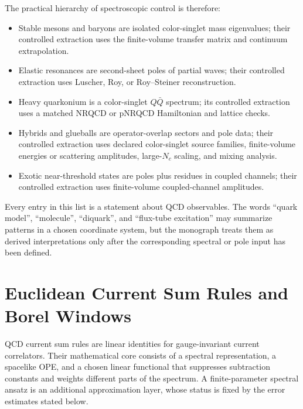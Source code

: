 The practical hierarchy of spectroscopic control is therefore:
\begin{itemize}
  \item Stable mesons and baryons are isolated color-singlet mass eigenvalues;
  their controlled extraction uses the finite-volume transfer matrix and
  continuum extrapolation.
  \item Elastic resonances are second-sheet poles of partial waves; their
  controlled extraction uses Luscher, Roy, or Roy--Steiner reconstruction.
  \item Heavy quarkonium is a color-singlet \(Q\bar Q\) spectrum; its
  controlled extraction uses a matched NRQCD or pNRQCD Hamiltonian and
  lattice checks.
  \item Hybrids and glueballs are operator-overlap sectors and pole data; their
  controlled extraction uses declared color-singlet source families,
  finite-volume energies or scattering amplitudes, large-\(N_c\) scaling, and
  mixing analysis.
  \item Exotic near-threshold states are poles plus residues in coupled
  channels; their controlled extraction uses finite-volume coupled-channel
  amplitudes.
\end{itemize}
Every entry in this list is a statement about QCD observables.  The words
``quark model'', ``molecule'', ``diquark'', and ``flux-tube excitation'' may
summarize patterns in a chosen coordinate system, but the monograph treats
them as derived interpretations only after the corresponding spectral or pole
input has been defined.

\section{Euclidean Current Sum Rules and Borel Windows}
\label{sec:qcd-current-sum-rules-borel-windows}

QCD current sum rules are linear identities for gauge-invariant current
correlators.  Their mathematical core consists of a spectral representation, a
spacelike OPE, and a chosen linear functional that suppresses subtraction
constants and weights different parts of the spectrum.  A finite-parameter
spectral ansatz is an additional approximation layer, whose status is fixed by
the error estimates stated below.

